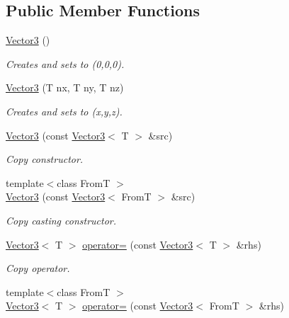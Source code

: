 \subsection*{Public Member Functions}
\begin{DoxyCompactItemize}
\item 
\hyperlink{class_vector3_a54f99f4211298d5245ea578bdd5143cc}{Vector3} ()
\begin{DoxyCompactList}\small\item\em Creates and sets to (0,0,0). \item\end{DoxyCompactList}\item 
\hyperlink{class_vector3_af2877fe01d7847181d33860005c4c1eb}{Vector3} (T nx, T ny, T nz)
\begin{DoxyCompactList}\small\item\em Creates and sets to (x,y,z). \item\end{DoxyCompactList}\item 
\hyperlink{class_vector3_aa2fec2c441bba344389faf2a5365079e}{Vector3} (const \hyperlink{class_vector3}{Vector3}$<$ T $>$ \&src)
\begin{DoxyCompactList}\small\item\em Copy constructor. \item\end{DoxyCompactList}\item 
{\footnotesize template$<$class FromT $>$ }\\\hyperlink{class_vector3_aba28547320ba45406511ae1113c8167f}{Vector3} (const \hyperlink{class_vector3}{Vector3}$<$ FromT $>$ \&src)
\begin{DoxyCompactList}\small\item\em Copy casting constructor. \item\end{DoxyCompactList}\item 
\hyperlink{class_vector3}{Vector3}$<$ T $>$ \hyperlink{class_vector3_abe7d8e30be809e8dd0456ac8a3cf4e90}{operator=} (const \hyperlink{class_vector3}{Vector3}$<$ T $>$ \&rhs)
\begin{DoxyCompactList}\small\item\em Copy operator. \item\end{DoxyCompactList}\item 
{\footnotesize template$<$class FromT $>$ }\\\hyperlink{class_vector3}{Vector3}$<$ T $>$ \hyperlink{class_vector3_a84dd48a557067f2ad46ea72f7de6fa3b}{operator=} (const \hyperlink{class_vector3}{Vector3}$<$ FromT $>$ \&rhs)

\end{DoxyCompactItemize}

